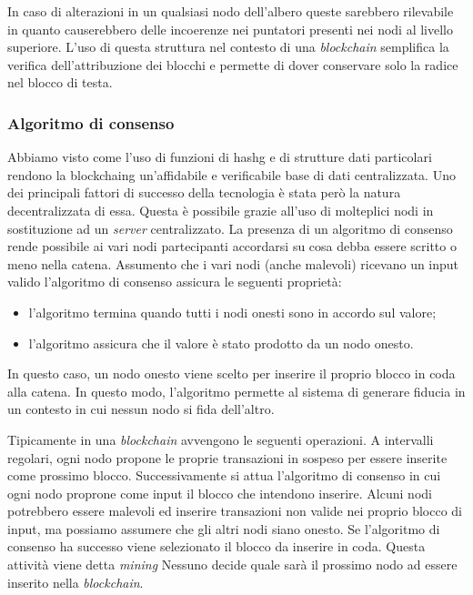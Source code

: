 In caso di alterazioni in un qualsiasi nodo dell'albero queste sarebbero rilevabile in quanto causerebbero delle incoerenze nei puntatori presenti nei nodi al livello superiore. L'uso di questa struttura nel contesto di una \emph{blockchain} semplifica la verifica dell'attribuzione dei blocchi e permette di dover conservare solo la radice nel blocco di testa.

\subsubsection{Algoritmo di consenso}
\label{cap:alg-cons}
Abbiamo visto come l'uso di funzioni di \gls{hashg} e di strutture dati particolari rendono la \gls{blockchaing} un'affidabile e verificabile base di dati centralizzata. Uno dei principali fattori di successo della tecnologia è stata però la natura decentralizzata di essa. Questa è possibile grazie all'uso di molteplici nodi in sostituzione ad un \emph{server} centralizzato. La presenza di un algoritmo di consenso rende possibile ai vari nodi partecipanti accordarsi su cosa debba essere scritto o meno nella catena. Assumento che i vari nodi (anche malevoli) ricevano un input valido l'algoritmo di consenso assicura le seguenti proprietà:
\begin{itemize}
    \item l'algoritmo termina quando tutti i nodi onesti sono in accordo sul valore;
    \item l'algoritmo assicura che il valore è stato prodotto da un nodo onesto. 
\end{itemize}

In questo caso, un nodo onesto viene scelto per inserire il proprio blocco in coda alla catena. In questo modo, l'algoritmo permette al sistema di generare fiducia in un contesto in cui nessun nodo si fida dell'altro.

Tipicamente in una \emph{blockchain} avvengono le seguenti operazioni. A intervalli regolari, ogni nodo propone le proprie transazioni in sospeso per essere inserite come prossimo blocco. Successivamente si attua l'algoritmo di consenso in cui ogni nodo proprone come input il blocco che intendono inserire. Alcuni nodi potrebbero essere malevoli ed inserire transazioni non valide nei proprio blocco di input, ma possiamo assumere che gli altri nodi siano onesto. Se l'algoritmo di consenso ha successo viene selezionato il blocco da inserire in coda. Questa attività viene detta \emph{mining}
Nessuno decide quale sarà il prossimo nodo ad essere inserito nella \emph{blockchain}.

